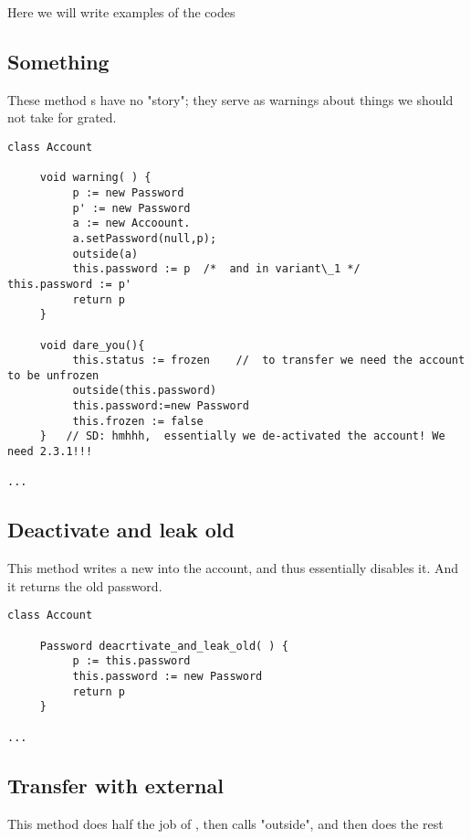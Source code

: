 Here we will write examples of the codes


\subsection{Something}

These  method s have no "story"; they serve  as warnings about things we should not take for grated.

\begin{lstlisting}[language=chainmail, mathescape=true, frame=lines]
class Account

     void warning( ) {
          p := new Password
          p' := new Password
          a := new Accoount.
          a.setPassword(null,p);
          outside(a)
          this.password := p  /*  and in variant\_1 */     this.password := p' 
          return p    
     }
     
     void dare_you(){
          this.status := frozen    //  to transfer we need the account to be unfrozen 
          outside(this.password)
          this.password:=new Password
          this.frozen := false
     }   // SD: hmhhh,  essentially we de-activated the account! We need 2.3.1!!!
     
...
\end{lstlisting}


\subsection*{Deactivate and leak old}

This method writes a new  into the account, and thus essentially disables it. And it returns the old password.

\begin{lstlisting}[language=chainmail, mathescape=true, frame=lines]
class Account

     Password deacrtivate_and_leak_old( ) {
          p := this.password
          this.password := new Password
          return p    
     }
     
...
\end{lstlisting}

\subsection{Transfer with external}

This method  does half the job of  , then calls "outside", and then does the rest

